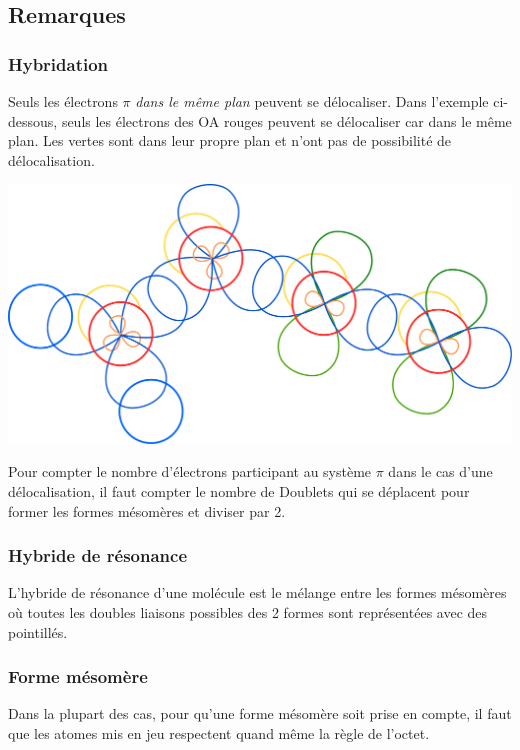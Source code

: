 \documentclass[french]{yLectureNote}
\begin{document}
\subsection{Remarques}
\subsubsection{Hybridation}
Seuls les électrons $\pi$ \emph{dans le m\^eme plan} peuvent se délocaliser. Dans l'exemple ci-dessous, seuls les électrons des OA rouges peuvent se délocaliser car dans le m\^eme plan. Les vertes sont dans leur propre plan et n'ont pas de possibilité de délocalisation.

\includegraphics[scale=0.3]{s1}

Pour compter le nombre d'électrons participant au système $\pi$ dans le cas d'une délocalisation, il faut compter le nombre de Doublets qui se déplacent pour former les formes mésomères et diviser par 2.
\subsubsection{Hybride de résonance}
L'hybride de résonance d'une molécule est le mélange entre les formes mésomères où toutes les doubles liaisons possibles des 2 formes sont représentées avec des pointillés.
\subsubsection{Forme mésomère}
Dans la plupart des cas, pour qu'une forme mésomère soit prise en compte, il faut que les atomes mis en jeu respectent quand m\^eme la règle de l'octet.
\end{document}
